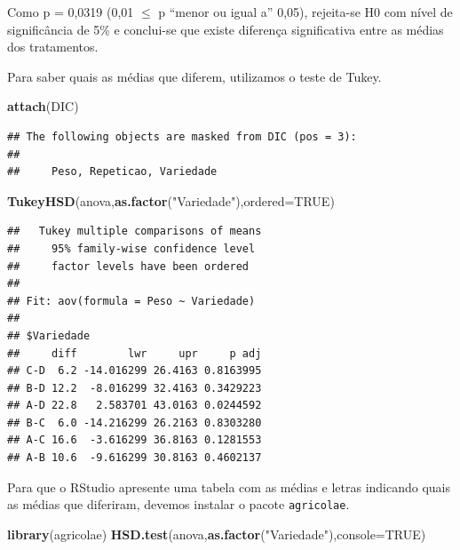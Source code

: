 \documentclass[12pt,brazil,]{book}
\newenvironment{Shaded}{\begin{snugshade}}{\end{snugshade}}
\newcommand{\DataTypeTok}[1]{\textcolor[rgb]{0.13,0.29,0.53}{#1}}
\newcommand{\KeywordTok}[1]{\textcolor[rgb]{0.13,0.29,0.53}{\textbf{#1}}}
\newcommand{\NormalTok}[1]{#1}
\newcommand{\OtherTok}[1]{\textcolor[rgb]{0.56,0.35,0.01}{#1}}
\newcommand{\StringTok}[1]{\textcolor[rgb]{0.31,0.60,0.02}{#1}}
\begin{document}
Como p = 0,0319 (0,01 \(\leq\) p ``menor ou igual a'' 0,05), rejeita-se
H0 com nível de significância de 5\% e conclui-se que existe diferença
significativa entre as médias dos tratamentos.

Para saber quais as médias que diferem, utilizamos o teste de Tukey.

\begin{Shaded}
\begin{Highlighting}[]
\KeywordTok{attach}\NormalTok{(DIC)}
\end{Highlighting}
\end{Shaded}

\begin{verbatim}
## The following objects are masked from DIC (pos = 3):
## 
##     Peso, Repeticao, Variedade
\end{verbatim}

\begin{Shaded}
\begin{Highlighting}[]
\KeywordTok{TukeyHSD}\NormalTok{(anova,}\KeywordTok{as.factor}\NormalTok{(}\StringTok{"Variedade"}\NormalTok{),}\DataTypeTok{ordered=}\OtherTok{TRUE}\NormalTok{)}
\end{Highlighting}
\end{Shaded}

\begin{verbatim}
##   Tukey multiple comparisons of means
##     95% family-wise confidence level
##     factor levels have been ordered
## 
## Fit: aov(formula = Peso ~ Variedade)
## 
## $Variedade
##     diff        lwr     upr     p adj
## C-D  6.2 -14.016299 26.4163 0.8163995
## B-D 12.2  -8.016299 32.4163 0.3429223
## A-D 22.8   2.583701 43.0163 0.0244592
## B-C  6.0 -14.216299 26.2163 0.8303280
## A-C 16.6  -3.616299 36.8163 0.1281553
## A-B 10.6  -9.616299 30.8163 0.4602137
\end{verbatim}

Para que o RStudio apresente uma tabela com as médias e letras indicando
quais as médias que diferiram, devemos instalar o pacote
\texttt{agricolae}.

\begin{Shaded}
\begin{Highlighting}[]
\KeywordTok{library}\NormalTok{(agricolae)}
\KeywordTok{HSD.test}\NormalTok{(anova,}\KeywordTok{as.factor}\NormalTok{(}\StringTok{"Variedade"}\NormalTok{),}\DataTypeTok{console=}\OtherTok{TRUE}\NormalTok{)}
\end{Highlighting}
\end{Shaded}
\end{document}
